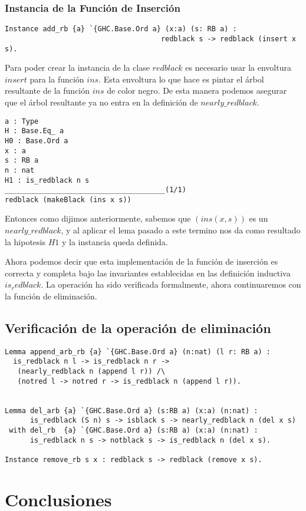 \documentclass[letterpaper,12pt,oneside]{book}
\theoremstyle{plain}
\theoremstyle{definition}
\theoremstyle{remark}
\begin{document}
\subsection{Instancia de la Funci\'on de Inserci\'on}
\begin{verbatim}
Instance add_rb {a} `{GHC.Base.Ord a} (x:a) (s: RB a) :
                                     redblack s -> redblack (insert x s).
\end{verbatim}
Para poder crear la instancia de la clase $redblack$ es necesario usar la envoltura $insert$ para la funci\'on $ins$. Esta envoltura lo que hace es pintar el \'arbol resultante de la funci\'on $ins$ de color negro. De esta manera podemos asegurar que el \'arbol resultante ya no entra en la definici\'on de $nearly\_redblack$.
\begin{verbatim}
a : Type
H : Base.Eq_ a
H0 : Base.Ord a
x : a
s : RB a
n : nat
H1 : is_redblack n s
______________________________________(1/1)
redblack (makeBlack (ins x s))
\end{verbatim}
Entonces como dijimos anteriormente, sabemos que $(ins(x,s))$ es un $nearly\_redblack$, y al aplicar el lema pasado a este termino nos da como resultado la hipotesis $H1$ y la instancia queda definida.

Ahora podemos decir que esta implementaci\'on de la funci\'on de inserci\'on es correcta y completa bajo las invariantes establecidas en las definici\'on inductiva $is_redblack$. La operaci\'on ha sido verificada formalmente, ahora continuaremos con la funci\'on de eliminaci\'on.  
\section{Verificación de la operación de eliminación}
\begin{verbatim}
Lemma append_arb_rb {a} `{GHC.Base.Ord a} (n:nat) (l r: RB a) : 
  is_redblack n l -> is_redblack n r ->
   (nearly_redblack n (append l r)) /\
   (notred l -> notred r -> is_redblack n (append l r)).


Lemma del_arb {a} `{GHC.Base.Ord a} (s:RB a) (x:a) (n:nat) :
      is_redblack (S n) s -> isblack s -> nearly_redblack n (del x s)
 with del_rb  {a} `{GHC.Base.Ord a} (s:RB a) (x:a) (n:nat) :
      is_redblack n s -> notblack s -> is_redblack n (del x s).

Instance remove_rb s x : redblack s -> redblack (remove x s).
\end{verbatim}
\chapter{Conclusiones}  
\backmatter%
\end{document}
